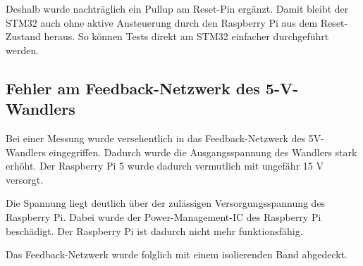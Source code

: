Deshalb wurde nachträglich ein Pullup am Reset-Pin ergänzt. Damit bleibt der STM32 auch ohne aktive Ansteuerung durch den Raspberry Pi  aus dem Reset-Zustand heraus. So können Tests direkt am STM32 einfacher durchgeführt werden.

\subsection{Fehler am Feedback-Netzwerk des 5-V-Wandlers}
Bei einer Messung wurde versehentlich in das Feedback-Netzwerk des 5V-Wandlers eingegriffen. Dadurch wurde die Ausgangsspannung des Wandlers stark erhöht. Der Raspberry Pi 5 wurde dadurch vermutlich mit ungefähr 15 V versorgt.

Die Spannung liegt deutlich über der zulässigen Versorgungsspannung des Raspberry Pi. Dabei wurde der Power-Management-IC des Raspberry Pi beschädigt. Der Raspberry Pi ist dadurch nicht mehr funktionsfähig.

Das Feedback-Netzwerk wurde folglich mit einem isolierenden Band abgedeckt.


